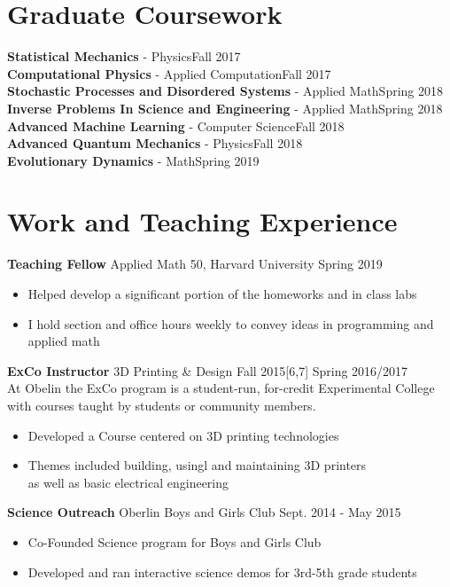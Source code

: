 \documentclass[margin]{res}
\begin{document}
\begin{resume}
		\section{Graduate Coursework}

{\bf Statistical Mechanics} - Physics\hfill Fall  2017\\ 
{\bf Computational Physics} - Applied Computation\hfill Fall  2017\\ 
{\bf Stochastic Processes and Disordered Systems} - Applied Math\hfill Spring  2018\\ 
{\bf Inverse Problems In Science and Engineering} - Applied Math\hfill Spring  2018\\ 
{\bf Advanced Machine Learning} - Computer Science\hfill Fall  2018\\ 
{\bf Advanced Quantum Mechanics} - Physics\hfill Fall  2018\\ 
{\bf Evolutionary Dynamics} - Math\hfill Spring 2019\\ 





	
	\section{Work and Teaching Experience}
	{\bf Teaching Fellow} Applied Math 50, Harvard University \hfill Spring 2019
	\begin{itemize}
		\item Helped develop a significant portion of the homeworks and in class labs
		\item I hold section and office hours weekly to convey ideas in programming and applied math
	\end{itemize}
	{\bf ExCo Instructor} 3D Printing \& Design \hfill\small {Fall 2015[6,7] Spring 2016/2017}
	\normalsize\\
	At Obelin the ExCo program is a student-run, for-credit Experimental College with courses taught by students or community members.
	\begin{itemize} \itemsep -2pt  %
		\item Developed a Course centered on 3D printing technologies
		\item Themes included building, usingl and maintaining 3D printers\\ as well as basic electrical engineering
	\end{itemize}
	 
	{\bf Science Outreach} Oberlin Boys and Girls Club \hfill Sept. 2014 - May 2015
	\begin{itemize} \itemsep -2pt  %
		\item Co-Founded Science program for Boys and Girls Club
		\item Developed and ran interactive science demos for 3rd-5th grade students
	\end{itemize}
	

\end{resume}
\end{document}
